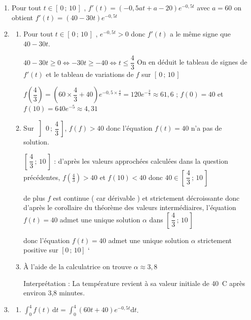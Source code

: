\begin{enumerate}
\item Pour tout $t\in [\,0\,;\,10\,]$ , $ f'(t) =\left(-0{,}5 a t + a - 20\right) e^{-0{,}5t}$ avec $a=60$ on obtient $ f'(t) =(40 - 30 t) e^{-0{,}5 t}$

\item 
	\begin{enumerate}
		\item Pour tout $t\in [\,0\,;\,10\,]$ , $e^{-0{,}5t}>0$ donc $f'(t)$ a le même signe que $40 - 30t$.  

$40-30t \geqslant 0 \iff -30t \geqslant -40 \iff t \leqslant  \dfrac{4}{3}$ On en déduit le tableau de signes de $f'(t)$ et le tableau de variations de $f$ sur  $ [\,0\,;\,10\,]$ 


$f\left(\dfrac{4}{3}\right) =  \left(60 \times \dfrac{4}{3} + 40\right) e^{-0,5 \times \frac{4}{3}} = 120e^{-\frac{2}{3}}\approx 61,6$ ; $f(0)=40$ et $f(10)= 640 e^{-5} \approx 4,31 $

\item Sur $\left]\,0\,;\,\dfrac{4}{3}\,\right]$, $f(f)>40$ donc l'équation  $f(t) = 40$ n'a pas de solution. 

$\left[\,\dfrac{4}{3}\,;\,10\,\right]$ : d'après les valeurs approchées calculées dans la question précédentes, $f(\frac{4}{3}) > 40$ et $f(10) < 40$ donc $40 \in \left[\,\dfrac{4}{3}\,;\,10\,\right]$

de plus $f$ est continue ( car dérivable ) et strictement décroissante donc d'après le corollaire du théorème des valeurs intermédiaires, l'équation $f(t) = 40$ admet une unique solution $\alpha$ dans $\left[\,\dfrac{4}{3}\,;\,10\,\right]$

donc l'équation $f(t) = 40$ admet une unique solution $\alpha$
strictement positive sur $[0\,; \,10]$
`
\item À l'aide de la calculatrice on trouve $\alpha \approx 3,8$

Interprétation : La température revient à sa valeur initiale de 40~\degres C après environ 3,8 minutes.
\end{enumerate}

\item
	\begin{enumerate}
		\item $\displaystyle \int_0^4 f(t)\,\text{d}t =\displaystyle  \int_0^4 (60 t + 40) e^{-0{,}5t} \text{d}t$.


\end{enumerate}
\end{enumerate}
